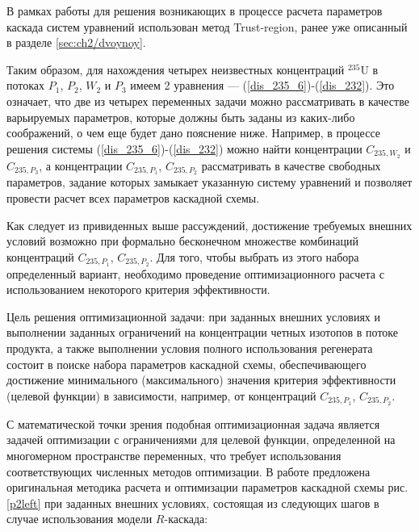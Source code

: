 В рамках работы для решения возникающих в процессе расчета параметров каскада систем уравнений использован метод Trust-region, ранее уже описанный в разделе \ref{sec:ch2/dvoynoy}.

Таким образом, для нахождения четырех неизвестных концентраций $^{235}$U в потоках $P_1$, $P_2$, $W_2$ и $P_3$ имеем 2 уравнения --- (\ref{dis_235_6})-(\ref{dis_232}). Это означает, что две из четырех переменных задачи можно рассматривать в качестве варьируемых параметров, которые должны быть заданы из каких-либо соображений, о чем еще будет дано пояснение ниже. Например, в процессе решения системы (\ref{dis_235_6})-(\ref{dis_232}) можно найти концентрации $C_{235,{W_2}}$ и $C_{235,{P_3}}$, а концентрации $C_{235,{P_1}}$, $C_{235,{P_2}}$ рассматривать в качестве свободных параметров, задание которых замыкает указанную систему уравнений и позволяет провести расчет всех параметров каскадной схемы. 

Как следует из привиденных выше рассуждений, достижение требуемых внешних условий возможно при формально бесконечном множестве комбинаций концентраций $C_{235,{P_1}}$, $C_{235,{P_2}}$. Для того, чтобы выбрать из этого набора определенный вариант, необходимо проведение оптимизационного расчета с использованием некоторого критерия эффективности. 

Цель решения оптимизационной задачи: при заданных внешних условиях и выполнении заданных ограничений на концентрации четных изотопов в потоке продукта, а также выполнении условия полного использования регенерата состоит в поиске набора параметров каскадной схемы, обеспечивающего достижение минимального (максимального) значения критерия эффективности (целевой функции) в зависимости, например, от концентраций $C_{235,{P_1}}$, $C_{235,{P_2}}$.

С математической точки зрения подобная оптимизационная задача является задачей оптимизации с ограничениями для целевой функции, определенной на многомерном пространстве переменных, что требует использования соответствующих численных методов оптимизации. В работе предложена оригинальная методика расчета и оптимизации параметров каскадной схемы рис. \ref{p2left} при заданных внешних условиях, состоящая из следующих шагов в случае использования модели $R$-каскада:


